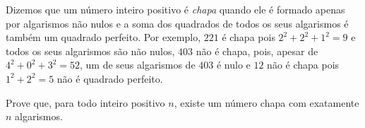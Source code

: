 Dizemos que um número inteiro positivo é \textit{chapa} quando ele é formado apenas por algarismos não nulos e a soma dos quadrados de todos os seus algarismos é também um quadrado perfeito.
Por exemplo, $221$ é chapa pois $2^2 + 2^2 + 1^2 = 9$ e todos os seus algarismos são não nulos, $403$ não é chapa, pois, apesar de $4^2 + 0^2 + 3^2 = 52$, um de seus algarismos de $403$ é nulo e $12$ não é chapa pois $1^2 + 2^2 = 5$ não é quadrado perfeito. 

Prove que, para todo inteiro positivo $n$, existe um número chapa com exatamente $n$ algarismos.
